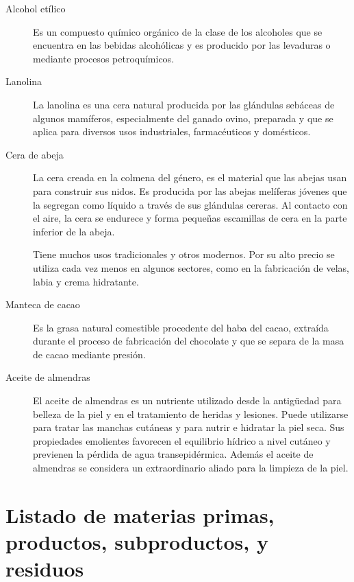 \documentclass[12pt]{article}
\begin{document}
\begin{description}
	\item[Alcohol etílico] Es un compuesto químico orgánico de la clase de los alcoholes que se encuentra en las bebidas alcohólicas y es producido por las levaduras o mediante procesos petroquímicos.
	\item[Lanolina] La lanolina es una cera natural producida por las glándulas sebáceas de algunos mamíferos, especialmente del ganado ovino, preparada y que se aplica para diversos usos industriales, farmacéuticos y domésticos.
	\item[Cera de abeja] La cera creada en la colmena del género, es el material que las abejas usan para construir sus nidos. Es producida por las abejas melíferas jóvenes que la segregan como líquido a través de sus glándulas cereras. Al contacto con el aire, la cera se endurece y forma pequeñas escamillas de cera en la parte inferior de la abeja.

	Tiene muchos usos tradicionales y otros modernos. Por su alto precio se utiliza cada vez menos en algunos sectores, como en la fabricación de velas, labia y crema hidratante.
	\item[Manteca de cacao] Es la grasa natural comestible procedente del haba del cacao, extraída durante el proceso de fabricación del chocolate y que se separa de la masa de cacao mediante presión.
	\item[Aceite de almendras] El aceite de almendras es un nutriente utilizado desde la antigüedad para belleza de la piel y en el tratamiento de heridas y lesiones. Puede utilizarse para tratar las manchas cutáneas y para nutrir e hidratar la piel seca. Sus propiedades emolientes favorecen el equilibrio hídrico a nivel cutáneo y previenen la pérdida de agua transepidérmica. Además el aceite de almendras se considera un extraordinario aliado para la limpieza de la piel.
\end{description}
\section{Listado de materias primas, productos, subproductos, y residuos}
\end{document}

